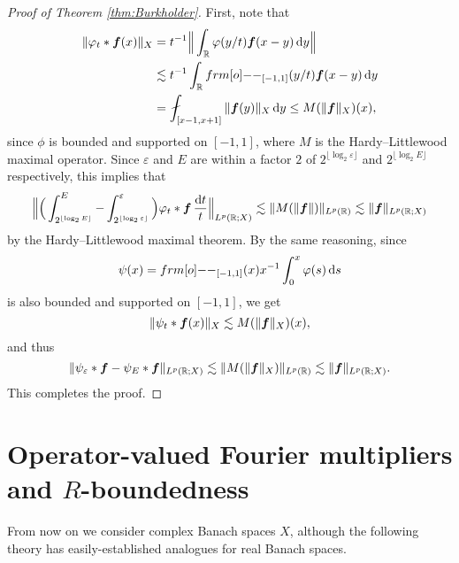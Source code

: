 \begin{proof}[Proof of Theorem \ref{thm:Burkholder}]
First, note that
\begin{equation*}
  \begin{aligned}
    \|\phi_{t} \ast \mb{f}(x)\|_{X} &= t^{-1} \Big\| \int_{\R} \phi(y/t) \mb{f}(x-y) \, \dd y \Big\| \\
    &\lesssim t^{-1} \int_{\R} \1_{[-1,1]}(y/t) \mb{f}(x-y) \, \dd y \\
    &= \fint_{[x-1, x+1]} \|\mb{f}(y)\|_{X} \, \dd y \leq M(\|\mb{f}\|_{X})(x),
  \end{aligned}
\end{equation*}
since $\phi$ is bounded and supported on $[-1,1]$, where $M$ is the Hardy--Littlewood maximal operator.
Since $\varepsilon$ and $E$ are within a factor $2$ of $2^{\lfloor \log_{2} \varepsilon \rfloor}$ and $2^{\lfloor \log_{2} E \rfloor}$ respectively, this implies that
\begin{equation*}
  \Big\| \Big( \int_{2^{\lfloor \log_{2} E \rfloor}}^{E} - \int_{2^{\lfloor \log_{2} \varepsilon \rfloor}}^{\varepsilon} \Big) \varphi_{t} \ast \bm{f} \, \frac{\mathrm{d} t}{t} \Big\|_{L^p(\mathbb{R};X)}
  \lesssim \|M(\|\bm{f}\|)\|_{L^p(\mathbb{R})} \lesssim \|\bm{f}\|_{L^p(\mathbb{R};X)}
\end{equation*}
by the Hardy--Littlewood maximal theorem.
By the same reasoning, since
\begin{equation*}
  \psi(x) = \1_{[-1,1]}(x) x^{-1} \int_{0}^{x} \phi(s) \, \dd s
\end{equation*}
is also bounded and supported on $[-1,1]$, we get
\begin{equation*}
  \|\psi_{t} \ast \bm{f}(x)\|_{X} \lesssim M(\|\bm{f}\|_{X})(x),
\end{equation*}
and thus
\begin{equation*}
  \|\psi_{\varepsilon} \ast \bm{f} - \psi_{E} \ast \bm{f}\|_{L^p(\mathbb{R};X)} \lesssim \|M(\|\bm{f}\|_{X})\|_{L^p(\mathbb{R})} \lesssim \|\bm{f}\|_{L^p(\mathbb{R};X)}.
\end{equation*}
This completes the proof.
\end{proof}

\section{Operator-valued Fourier multipliers and $R$-boundedness}

From now on we consider complex Banach spaces $X$, although the following theory has easily-established analogues for real Banach spaces.

